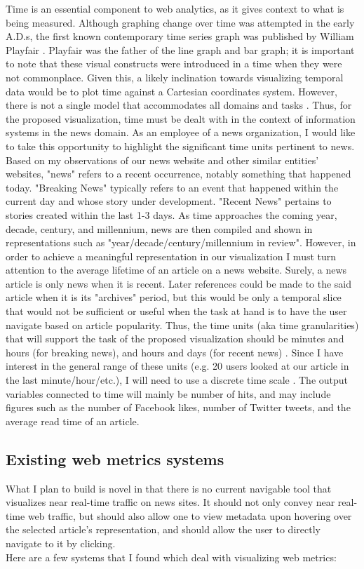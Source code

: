 \documentclass[12pt]{article}
\begin{document}
Time is an essential component to web analytics, as it gives context to what is being measured. Although graphing change over time was attempted in the early A.D.s, the first known contemporary time series graph was published by William Playfair \cite{playfair}. Playfair was the father of the line graph and bar graph; it is important to note that these visual constructs were introduced in a time when they were not commonplace. Given this, a likely inclination towards visualizing temporal data would be to plot time against a Cartesian coordinates system. However, there is not a single model that accommodates all domains and tasks \cite{frank}. Thus, for the proposed visualization, time must be dealt with in the context of information systems in the news domain. As an employee of a news organization, I would like to take this opportunity to highlight the significant time units pertinent to news. Based on my observations of our news website and other similar entities’ websites, "news" refers to a recent occurrence, notably something that happened today. "Breaking News" typically refers to an event that happened within the current day and whose story under development. "Recent News" pertains to stories created within the last 1-3 days. As time approaches the coming year, decade, century, and millennium, news are then compiled and shown in representations such as "year/decade/century/millennium in review". However, in order to achieve a meaningful representation in our visualization I must turn attention to the average lifetime of an article on a news website. Surely, a news article is only news when it is recent. Later references could be made to the said article when it is its "archives" period, but this would be only a temporal slice that would not be sufficient or useful when the task at hand is to have the user navigate based on article popularity. Thus, the time units (aka time granularities) that will support the task of the proposed visualization should be minutes and hours (for breaking news), and hours and days (for recent news) \cite{bettini}. Since I have interest in the general range of these units (e.g. 20 users looked at our article in the last minute/hour/etc.), I will need to use a discrete time scale \cite{goralwalla}. The output variables connected to time will mainly be number of hits, and may include figures such as the number of Facebook likes, number of Twitter tweets, and the average read time of an article.

\subsection{Existing web metrics systems}
What I plan to build is novel in that there is no current navigable tool that visualizes near real-time traffic on news sites. It should not only convey near real-time web traffic, but should also allow one to view metadata upon hovering over the selected article's representation, and should allow the user to directly navigate to it by clicking.\\
Here are a few systems that I found which deal with visualizing web metrics: \\
\end{document}
